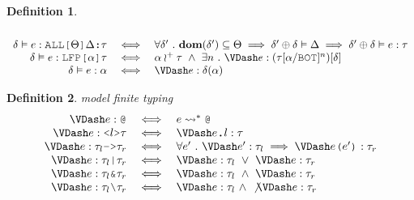 \documentclass[table,dvipsnames,acmsmall]{acmart}
\theoremstyle{definition}
\newtheorem{definition}{Definition}[section]
\begin{document}
\begin{definition}
\[\begin{array}[t]{rclcl}
      \\

      \delta \satisfies e \hastype \J{ALL[}\Theta\J{]}\Delta \J{:} \tau
      &\iff& 
      \forall \delta' \qua
      \textbf{dom}(\delta') \subseteq \Theta
      \implies
      \delta' \oplus \delta \satisfies \Delta 
      \implies
      \delta' \oplus \delta \satisfies e \hastype \tau

      \\

      \delta \satisfies e \hastype \J{LFP[}\alpha\J{]}\tau 
      &\iff& 
      \alpha \wr^+ \tau
      \up
      \exists n \qua \VDash e \hastype (\tau[\alpha \slash \J{BOT}]^n)[\delta]

      \\

      \delta \satisfies e \hastype \alpha 
      &\iff& 
      \VDash e \hastype \delta(\alpha) 
  \end{array}
  \]
\end{definition}

\begin{definition}
  \label{def:model_finite_typing}
  \emph{model finite typing}
  \hfill
  \small
  \nopad
  \[
  \begin{array}[t]{rclcl}

      \VDash e \hastype \J{@}
      &\iff& 
      e \rightsquigarrow^* \J{@}

      \\

      \VDash e \hastype \J{<} l \J{>} \tau
      &\iff& 
      \VDash e\J{.}l \hastype \tau 

      \\

      \VDash e \hastype \tau_l \J{->} \tau_r
      &\iff& 
      \forall e' \qua
      \VDash e' \hastype \tau_l 
      \implies
      \VDash e\J{(}e'\J{)} \hastype \tau_r

      \\

      \VDash e \hastype \tau_l \J{|} \tau_r 
      &\iff& 
      \VDash e \hastype \tau_l
      \down
      \VDash e \hastype \tau_r

      \\

      \VDash e \hastype \tau_l \J{\&} \tau_r 
      &\iff& 
      \VDash e \hastype \tau_l
      \up
      \VDash e \hastype \tau_r

      \\

      \VDash e \hastype \tau_l \typdiff \tau_r
      &\iff& 
      \VDash e \hastype \tau_l
      \up
      \not\VDash e \hastype \tau_r
  \end{array}
  \]
\end{definition}
\end{document}
